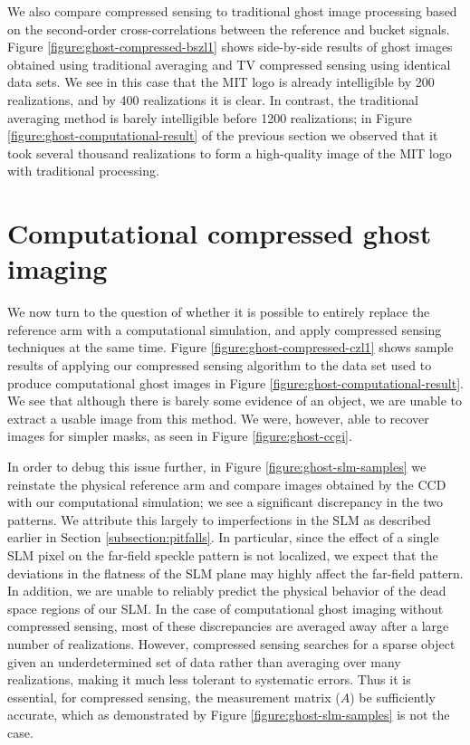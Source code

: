 We also compare compressed sensing to traditional ghost image processing based on the second-order cross-correlations between the reference and bucket signals. Figure \ref{figure:ghost-compressed-bszl1} shows side-by-side results of ghost images obtained using traditional averaging and TV compressed sensing using identical data sets. We see in this case that the MIT logo is already intelligible by 200 realizations, and by 400 realizations it is clear. In contrast, the traditional averaging method is barely intelligible before 1200 realizations; in Figure \ref{figure:ghost-computational-result} of the previous section we observed that it took several thousand realizations to form a high-quality image of the MIT logo with traditional processing.

\section{Computational compressed ghost imaging}

We now turn to the question of whether it is possible to entirely replace the reference arm with a computational simulation, and apply compressed sensing techniques at the same time. Figure \ref{figure:ghost-compressed-czl1} shows sample results of applying our compressed sensing algorithm to the data set used to produce computational ghost images in Figure \ref{figure:ghost-computational-result}. We see that although there is barely some evidence of an object, we are unable to extract a usable image from this method. We were, however, able to recover images for simpler masks, as seen in Figure \ref{figure:ghost-ccgi}.

In order to debug this issue further, in Figure \ref{figure:ghost-slm-samples} we reinstate the physical reference arm and compare images obtained by the CCD with our computational simulation; we see a significant discrepancy in the two patterns. We attribute this largely to imperfections in the SLM as described earlier in Section \ref{subsection:pitfalls}. In particular, since the effect of a single SLM pixel on the far-field speckle pattern is not localized, we expect that the deviations in the flatness of the SLM plane may highly affect the far-field pattern. In addition, we are unable to reliably predict the physical behavior of the dead space regions of our SLM. In the case of computational ghost imaging without compressed sensing, most of these discrepancies are averaged away after a large number of realizations. However, compressed sensing searches for a sparse object given an underdetermined set of data rather than averaging over many realizations, making it much less tolerant to systematic errors. Thus it is essential, for compressed sensing, the measurement matrix ($A$) be sufficiently accurate, which as demonstrated by Figure \ref{figure:ghost-slm-samples} is not the case.

